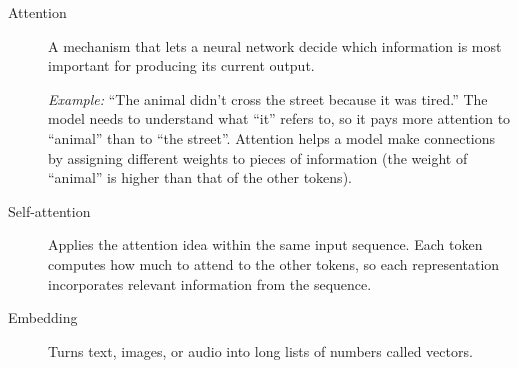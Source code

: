 \documentclass[a4paper,12pt]{report}
\begin{document}
\begin{description}
  \item[Attention] A mechanism that lets a neural network decide which information is most important for producing its current output.
  \par\smallskip
  \textit{Example:} ``The animal didn't cross the street because it was tired.'' The model needs to understand what ``it'' refers to, so it pays more attention to ``animal'' than to ``the street''. Attention helps a model make connections by assigning different weights to pieces of information (the weight of ``animal'' is higher than that of the other tokens).

  \item[Self-attention] Applies the attention idea within the same input sequence. Each token computes how much to attend to the other tokens, so each representation incorporates relevant information from the sequence.

  \item[Embedding] Turns text, images, or audio into long lists of numbers called vectors.
\end{description}

\end{document}
